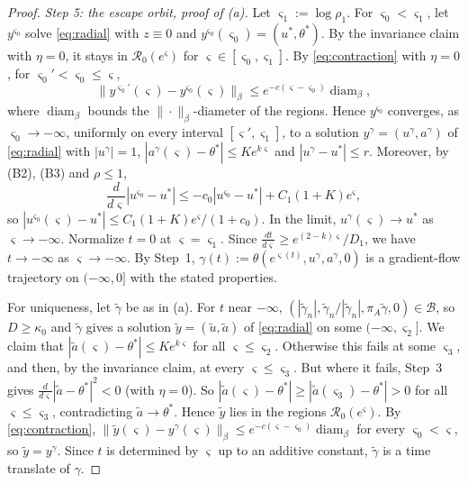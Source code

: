 \documentclass[11pt]{article}
\theoremstyle{definition}
\theoremstyle{remark}
\numberwithin{equation}{section}
\newcommand{\cB}{\mathcal{B}}
\newcommand{\cR}{\mathcal{R}}
\begin{document}
\begin{proof}
\emph{Step 5: the escape orbit, proof of (a).} Let $\varsigma_1:=\log\rho_1$. For $\varsigma_0<\varsigma_1$, let $y^{\varsigma_0}$ solve \eqref{eq:radial} with $z\equiv0$ and $y^{\varsigma_0}(\varsigma_0)=(u^*,\theta^*)$. By the invariance claim with $\eta=0$, it stays in $\cR_0(e^\varsigma)$ for $\varsigma\in[\varsigma_0,\varsigma_1]$. By \eqref{eq:contraction} with $\eta=0$, for $\varsigma_0'<\varsigma_0\le\varsigma$,
\[
\|y^{\varsigma_0'}(\varsigma)-y^{\varsigma_0}(\varsigma)\|_\beta\le e^{-c(\varsigma-\varsigma_0)}\operatorname{diam}_\beta,
\]
where $\operatorname{diam}_\beta$ bounds the $\|\cdot\|_\beta$-diameter of the regions. Hence $y^{\varsigma_0}$ converges, as $\varsigma_0\to-\infty$, uniformly on every interval $[\varsigma',\varsigma_1]$, to a solution $y^\gamma=(u^\gamma,a^\gamma)$ of \eqref{eq:radial} with $|u^\gamma|=1$, $|a^\gamma(\varsigma)-\theta^*|\le Ke^{k\varsigma}$ and $|u^\gamma-u^*|\le r$. Moreover, by (B2), (B3) and $\rho\le1$,
\[
\frac{d}{d\varsigma}|u^{\varsigma_0}-u^*|\le-c_0|u^{\varsigma_0}-u^*|+C_1(1+K)e^{\varsigma},
\]
so $|u^{\varsigma_0}(\varsigma)-u^*|\le C_1(1+K)e^\varsigma/(1+c_0)$. In the limit, $u^\gamma(\varsigma)\to u^*$ as $\varsigma\to-\infty$. Normalize $t=0$ at $\varsigma=\varsigma_1$. Since $\frac{dt}{d\varsigma}\ge e^{(2-k)\varsigma}/D_1$, we have $t\to-\infty$ as $\varsigma\to-\infty$. By Step~1, $\gamma(t):=\theta(e^{\varsigma(t)},u^\gamma,a^\gamma,0)$ is a gradient-flow trajectory on $(-\infty,0]$ with the stated properties.

For uniqueness, let $\tilde\gamma$ be as in (a). For $t$ near $-\infty$, $(|\tilde\gamma_n|,\tilde\gamma_n/|\tilde\gamma_n|,\pi_A\tilde\gamma,0)\in\cB$, so $D\ge\kappa_0$ and $\tilde\gamma$ gives a solution $\tilde y=(\tilde u,\tilde a)$ of \eqref{eq:radial} on some $(-\infty,\varsigma_2]$. We claim that $|\tilde a(\varsigma)-\theta^*|\le Ke^{k\varsigma}$ for all $\varsigma\le\varsigma_2$. Otherwise this fails at some $\varsigma_3$, and then, by the invariance claim, at every $\varsigma\le\varsigma_3$. But where it fails, Step~3 gives $\frac{d}{d\varsigma}|\tilde a-\theta^*|^2<0$ (with $\eta=0$). So $|\tilde a(\varsigma)-\theta^*|\ge|\tilde a(\varsigma_3)-\theta^*|>0$ for all $\varsigma\le\varsigma_3$, contradicting $\tilde a\to\theta^*$. Hence $\tilde y$ lies in the regions $\cR_0(e^\varsigma)$. By \eqref{eq:contraction}, $\|\tilde y(\varsigma)-y^\gamma(\varsigma)\|_\beta\le e^{-c(\varsigma-\varsigma_0)}\operatorname{diam}_\beta$ for every $\varsigma_0<\varsigma$, so $\tilde y=y^\gamma$. Since $t$ is determined by $\varsigma$ up to an additive constant, $\tilde\gamma$ is a time translate of $\gamma$.


\end{proof}
\end{document}
